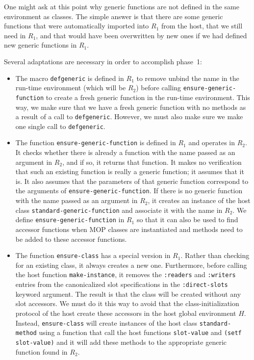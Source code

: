 One might ask at this point why generic functions are not defined in
the same environment as classes.  The simple answer is that there are
some generic functions that were automatically imported into $R_1$
from the host, that we still need in $R_1$, and that would have been
overwritten by new ones if we had defined new generic functions in
$R_1$.

Several adaptations are necessary in order to accomplish phase~1:

\begin{itemize}
\item The macro \texttt{defgeneric} is defined in $R_1$ to remove
  unbind the name in the run-time environment (which will be $R_2$)
  before calling \texttt{ensure-generic-function} to create a fresh
  generic function in the run-time environment.  This way, we make
  sure that we have a fresh generic function with no methods as a
  result of a call to \texttt{defgeneric}.  However, we must also make
  sure we make one single call to \texttt{defgeneric}.
\item The function \texttt{ensure-generic-function} is defined in
  $R_1$ and operates in $R_2$.  It checks whether there is already a
  function with the name passed as an argument in $R_2$, and if so, it
  returns that function.  It makes no verification that such an
  existing function is really a generic function; it assumes that it
  is.  It also assumes that the parameters of that generic function
  correspond to the arguments of \texttt{ensure-generic-function}.  If
  there is no generic function with the name passed as an argument in
  $R_2$, it creates an instance of the host class
  \texttt{standard-generic-function} and associate it with the name in
  $R_2$.  We define \texttt{ensure-generic-function} in $R_1$ so that
  it can also be used to find accessor functions when MOP classes are
  instantiated and methods need to be added to these accessor
  functions.
\item The function \texttt{ensure-class} has a special version in
  $R_1$.  Rather than checking for an existing class, it always
  creates a new one.  Furthermore, before calling the host function
  \texttt{make-instance}, it removes the \texttt{:readers} and
  \texttt{:writers} entries from the canonicalized slot specifications
  in the \texttt{:direct-slots} keyword argument.  The result is that
  the class will be created without any slot accessors.  We must do it
  this way to avoid that the class-initialization protocol of the host
  create these accessors in the host global environment $H$.  Instead,
  \texttt{ensure-class} will create instances of the host class
  \texttt{standard-method} using a function that call the host
  functions \texttt{slot-value} and \texttt{(setf slot-value)} and it
  will add these methods to the appropriate generic function found in
  $R_2$.
\end{itemize}

